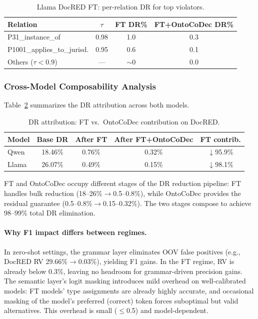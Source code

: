 \documentclass[11pt,a4paper]{article}
\newcommand{\sys}{OntoCoDec}
\newcommand{\pp}{\text{pp}}
\begin{document}
\begin{table}[t]
\centering
\small
\caption{Llama DocRED FT: per-relation DR for top violators.}
\label{tab:llama-perrel}
\begin{tabular}{lccc}
\toprule
\textbf{Relation} & $\tau$ & \textbf{FT DR\%} & \textbf{FT+\sys{} DR\%} \\
\midrule
P31\_instance\_of & 0.98 & 1.0 & 0.3 \\
P1001\_applies\_to\_jurisd. & 0.95 & 0.6 & 0.1 \\
Others ($\tau<0.9$) & --- & ${\sim}$0 & 0.0 \\
\bottomrule
\end{tabular}
\end{table}

\subsubsection{Cross-Model Composability Analysis}

Table~\ref{tab:cross-model} summarizes the DR attribution across both models.

\begin{table}[t]
\centering
\small
\caption{DR attribution: FT vs.\ \sys{} contribution on DocRED.}
\label{tab:cross-model}
\begin{tabular}{lcccc}
\toprule
\textbf{Model} & \textbf{Base DR} & \textbf{After FT} & \textbf{After FT+\sys{}} & \textbf{FT contrib.} \\
\midrule
Qwen & 18.46\% & 0.76\% & 0.32\% & $\downarrow$95.9\% \\
Llama & 26.07\% & 0.49\% & 0.15\% & $\downarrow$98.1\% \\
\bottomrule
\end{tabular}
\end{table}

FT and \sys{} occupy different stages of the DR reduction pipeline: FT handles bulk reduction (18--26\%$\rightarrow$0.5--0.8\%), while \sys{} provides the residual guarantee (0.5--0.8\%$\rightarrow$0.15--0.32\%).
The two stages compose to achieve 98--99\% total DR elimination.

\paragraph{Why F1 impact differs between regimes.}
In zero-shot settings, the grammar layer eliminates OOV false positives (e.g., DocRED RV 29.66\%$\rightarrow$0.03\%), yielding F1 gains.
In the FT regime, RV is already below 0.3\%, leaving no headroom for grammar-driven precision gains.
The semantic layer's logit masking introduces mild overhead on well-calibrated models: FT models' type assignments are already highly accurate, and occasional masking of the model's preferred (correct) token forces suboptimal but valid alternatives.
This overhead is small ($\leq$0.5\pp{}) and model-dependent.
\end{document}
